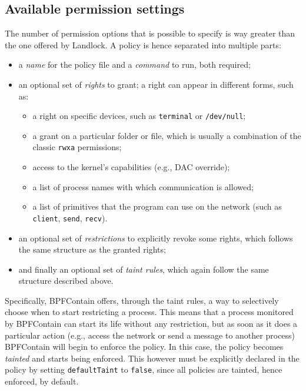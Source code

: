 \subsection{Available permission settings}

The number of permission options that is possible to specify is way greater than the one offered by Landlock.
A policy is hence separated into multiple parts:
\begin{itemize}
  \item a \textit{name} for the policy file and a \textit{command} to run, both required;
  \item an optional set of \textit{rights} to grant; a right can appear in different forms, such as:
        \begin{itemize}
          \item a right on specific devices, such as \texttt{terminal} or \texttt{/dev/null};
          \item a grant on a particular folder or file, which is usually a combination of the classic \texttt{rwxa} permissions;
          \item access to the kernel's capabilities (e.g., DAC override);
          \item a list of process names with which communication is allowed;
          \item a list of primitives that the program can use on the network (such as \texttt{client}, \texttt{send}, \texttt{recv}).
        \end{itemize}
  \item an optional set of \textit{restrictions} to explicitly revoke some rights, which follows the same structure as the
        granted rights;
  \item and finally an optional set of \textit{taint rules}, which again follow the same structure described above.
\end{itemize}

Specifically, BPFContain offers, through the taint rules, a way to selectively choose when
to start restricting a process.
This means that a process monitored by BPFContain can start its life without any restriction,
but as soon as it does a particular action (e.g., access the network or send a message to another process)
BPFContain will begin to enforce the policy.
In this case, the policy becomes \textit{tainted} and starts being enforced.
This however must be explicitly declared in the policy by setting \texttt{defaultTaint} to \texttt{false},
since all policies are tainted, hence enforced, by default.

